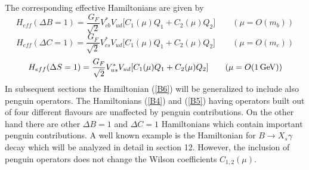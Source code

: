 \documentclass[12pt,rotate]{article}
\newcommand{\gev}{\, {\rm GeV}}
\begin{document}
\begin{itemize}
\begin{itemize}
The corresponding  effective Hamiltonians are given by
\begin{equation}\label{B4}
H_{eff}(\Delta B=1)=\frac{G_F}{\sqrt{2}}V_{cb}^{*}V_{ud}
\lbrack C_1(\mu) Q_1+C_2(\mu)Q_2 \rbrack
\qquad
(\mu=O(m_b))
\end{equation}
\begin{equation}\label{B5}
H_{eff}(\Delta C=1)=\frac{G_F}{\sqrt{2}}V_{cs}^{*}V_{ud}
\lbrack C_1(\mu) Q_1+C_2(\mu)Q_2 \rbrack
\qquad
(\mu=O(m_c))
\end{equation}
\begin{equation}\label{B6}
H_{eff}(\Delta S=1)=\frac{G_F}{\sqrt{2}}V_{us}^{*}V_{ud}
\lbrack C_1(\mu) Q_1+C_2(\mu)Q_2 \rbrack
\qquad
(\mu=O(1\gev))
\end{equation}
In subsequent sections the Hamiltonian (\ref{B6}) will be
generalized to include also penguin operators. 
The Hamiltonians (\ref{B4}) and (\ref{B5}) having operators
built out of four different flavours are unaffected by
penguin contributions. On the other hand there are other
$\Delta B=1$ and $\Delta C=1$ Hamiltonians which contain
important penguin contributions. A well known example is
the Hamiltonian for $B\to X_s\gamma$ decay which will be
analyzed in detail in section 12.
However, the inclusion of penguin operators does not
change the Wilson coefficients $C_{1,2}(\mu)$.


\end{itemize}
\end{itemize}
\end{document}
